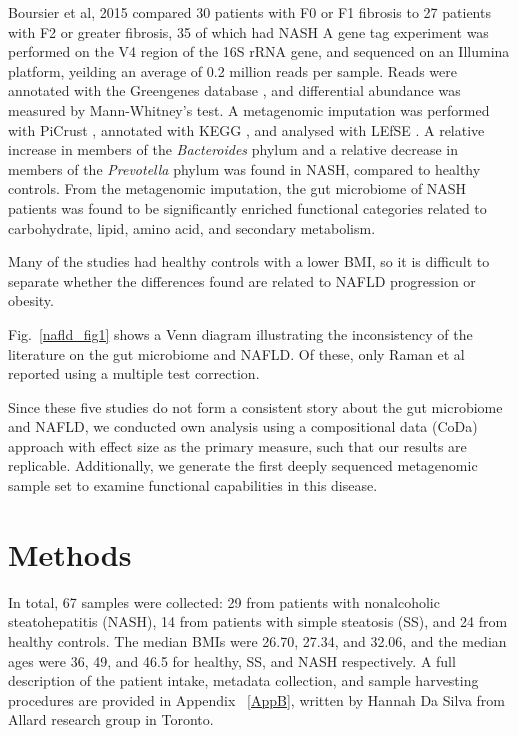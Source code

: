 Boursier et al, 2015 \cite{boursier2016severity} compared 30 patients with F0 or F1 fibrosis to 27 patients with F2 or greater fibrosis, 35 of which had NASH A gene tag experiment was performed on the V4 region of the 16S rRNA gene, and sequenced on an Illumina platform, yeilding an average of 0.2 million reads per sample. Reads were annotated with the Greengenes database \cite{desantis2006greengenes}, and differential abundance was measured by Mann-Whitney's test. A metagenomic imputation was performed with PiCrust \cite{langille2013predictive}, annotated with KEGG \cite{kanehisa2000kegg}, and analysed with LEfSE \cite{segata2011metagenomic}. A relative increase in members of the \textit{Bacteroides} phylum and a relative decrease in members of the \textit{Prevotella} phylum was found in NASH, compared to healthy controls. From the metagenomic imputation, the gut microbiome of NASH patients was found to be significantly enriched functional categories related to carbohydrate, lipid, amino acid, and secondary metabolism.

Many of the studies had healthy controls with a lower BMI, so it is difficult to separate whether the differences found are related to NAFLD progression or obesity.

Fig.~\ref{nafld_fig1} shows a Venn diagram illustrating the inconsistency of the literature on the gut microbiome and NAFLD. Of these, only Raman et al \cite{raman2013fecal} reported using a multiple test correction.

Since these five studies do not form a consistent story about the gut microbiome and NAFLD, we conducted own analysis using a compositional data (CoDa) approach with effect size as the primary measure, such that our results are replicable. Additionally, we generate the first deeply sequenced metagenomic sample set to examine functional capabilities in this disease.

\FloatBarrier

\section{Methods}
In total, 67 samples were collected: 29 from patients with nonalcoholic steatohepatitis (NASH), 14 from patients with simple steatosis (SS), and 24 from healthy controls. The median BMIs were 26.70, 27.34, and 32.06, and the median ages were 36, 49, and 46.5 for healthy, SS, and NASH respectively. A full description of the patient intake, metadata collection, and sample harvesting procedures are provided in Appendix ~\ref{AppB}, written by Hannah Da Silva from Allard research group in Toronto.

